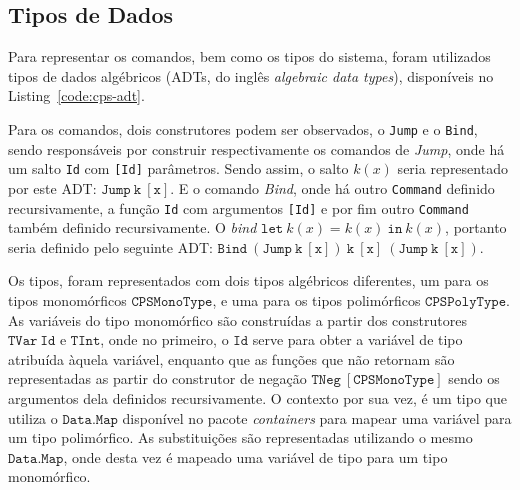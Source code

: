 \subsection{Tipos de Dados}\label{subsec:cps-adt}

Para representar os comandos, bem como os tipos do sistema, foram utilizados tipos de dados algébricos (ADTs, do inglês \textit{algebraic data types}), disponíveis no Listing~\ref{code:cps-adt}.


Para os comandos, dois construtores podem ser observados, o \texttt{Jump} e o \texttt{Bind}, sendo responsáveis por construir respectivamente os comandos de \textit{Jump}, onde há um salto \texttt{Id} com \texttt{[Id]} parâmetros.
Sendo assim, o salto $k(x)$ seria representado por este ADT: $\mathtt{Jump\ k\ [x]}$.
E o comando \textit{Bind}, onde há outro \texttt{Command} definido recursivamente, a função \texttt{Id} com argumentos \texttt{[Id]} e por fim outro \texttt{Command} também definido recursivamente.
O \textit{bind} $\mathtt{let}\ k(x) = k(x)\ \mathtt{in}\ k(x)$, portanto seria definido pelo seguinte ADT: $\mathtt{Bind\ (Jump\ k\ [x])\ k\ [x]\ (Jump\ k\ [x])}$.

Os tipos, foram representados com dois tipos algébricos diferentes, um para os tipos monomórficos $\mathtt{CPSMonoType}$, e uma para os tipos polimórficos $\mathtt{CPSPolyType}$.
As variáveis do tipo monomórfico são construídas a partir dos construtores $\mathtt{TVar\ Id}$ e $\mathtt{TInt}$, onde no primeiro, o $\mathtt{Id}$ serve para obter a variável de tipo atribuída àquela variável, enquanto que as funções que não retornam são representadas as partir do construtor de negação $\mathtt{TNeg\ [CPSMonoType]}$ sendo os argumentos dela definidos recursivamente.
O contexto por sua vez, é um tipo que utiliza o $\mathtt{Data.Map}$ disponível no pacote \textit{containers} para mapear uma variável para um tipo polimórfico.
As substituições são representadas utilizando o mesmo $\mathtt{Data.Map}$, onde desta vez é mapeado uma variável de tipo para um tipo monomórfico.
